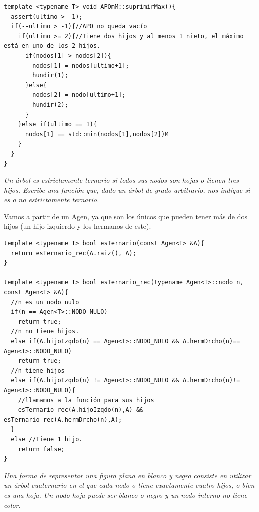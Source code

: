 \begin{verbatim}
template <typename T> void APOmM::suprimirMax(){
  assert(ultimo > -1);
  if(--ultimo > -1){//APO no queda vacío
    if(ultimo >= 2){//Tiene dos hijos y al menos 1 nieto, el máximo está en uno de los 2 hijos.
      if(nodos[1] > nodos[2]){
        nodos[1] = nodos[ultimo+1];
        hundir(1);
      }else{
        nodos[2] = nodo[ultimo+1];
        hundir(2);
      }
    }else if(ultimo == 1){
      nodos[1] == std::min(nodos[1],nodos[2])M
    }
  }
}
\end{verbatim}

\textbf{\large{}}\textit{ Un árbol es estrictamente ternario si todos sus nodos son hojas o tienen tres hijos. Escribe una función que, dado un árbol de grado arbitrario, nos indique si es o no estrictamente ternario.}

Vamos a partir de un Agen, ya que son los únicos que pueden tener más de dos hijos (un hijo izquierdo y los hermanos de este).

\begin{verbatim}
template <typename T> bool esTernario(const Agen<T> &A){
  return esTernario_rec(A.raiz(), A);
}

template <typename T> bool esTernario_rec(typename Agen<T>::nodo n, const Agen<T> &A){
  //n es un nodo nulo
  if(n == Agen<T>::NODO_NULO)
    return true;
  //n no tiene hijos.
  else if(A.hijoIzqdo(n) == Agen<T>::NODO_NULO && A.hermDrcho(n)== Agen<T>::NODO_NULO)
    return true;
  //n tiene hijos
  else if(A.hijoIzqdo(n) != Agen<T>::NODO_NULO && A.hermDrcho(n)!= Agen<T>::NODO_NULO){
    //llamamos a la función para sus hijos
    esTernario_rec(A.hijoIzqdo(n),A) && esTernario_rec(A.hermDrcho(n),A);
  }
  else //Tiene 1 hijo.
    return false;
}
\end{verbatim}

\textbf{\large{}}\textit{ Una forma de representar una figura plana en blanco y negro consiste en utilizar un árbol cuaternario en el que cada nodo o tiene exactamente cuatro hijos, o bien es una hoja. Un nodo hoja puede ser blanco o negro y un nodo interno no tiene color.}

